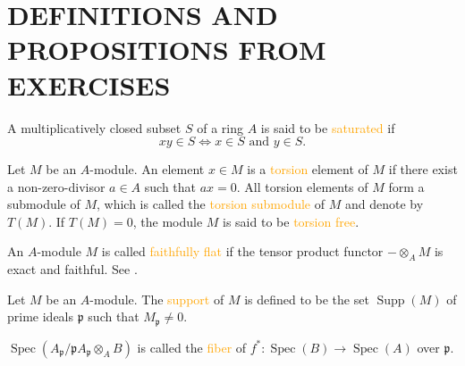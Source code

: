 \section*{DEFINITIONS AND PROPOSITIONS FROM EXERCISES}

\begin{definition}
	A multiplicatively closed subset $S$ of a ring $A$ is said to be \textcolor{orange}{saturated} if 
	\begin{equation*}
		xy\in S\Leftrightarrow x\in S\text{ and }y\in S.
	\end{equation*}
\end{definition}

\begin{definition}
	Let $M$ be an $A$-module. An element $x\in M$ is a \textcolor{orange}{torsion} element of $M$ if there exist a non-zero-divisor $a\in A$ such that $ax=0$. All torsion elements of $M$ form a submodule of $M$, which is called the \textcolor{orange}{torsion submodule} of $M$ and denote by $T(M)$. If $T(M)=0$, the module $M$ is said to be \textcolor{orange}{torsion free}.
\end{definition}

\begin{definition}
	An $A$-module $M$ is called \textcolor{orange}{faithfully flat} if the tensor product functor $-\otimes_AM$ is exact and faithful. See .
\end{definition}

\begin{definition}
	Let $M$ be an $A$-module. The \textcolor{orange}{support} of $M$ is defined to be the set $\operatorname{Supp}(M)$ of prime ideals $\mathfrak{p}$ such that $M_\mathfrak{p}\neq0$.
\end{definition}

\begin{definition}
	$\operatorname{Spec}\left(A_\mathfrak{p}/\mathfrak{p}A_\mathfrak{p}\otimes_AB\right)$ is called the \textcolor{orange}{fiber} of $f^*:\operatorname{Spec}(B)\rightarrow\operatorname{Spec}(A)$ over $\mathfrak{p}$.
\end{definition}
